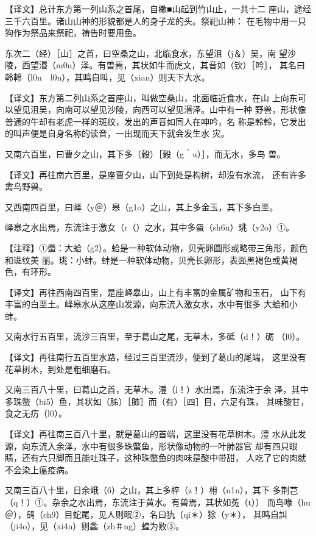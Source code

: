 \documentclass[a4paper,12pt,UTF8,twoside]{ctexbook}
\begin{document}
【译文】总计东方第一列山系之首尾，自樕■山起到竹山止，一共十二 座山，途经三千六百里。诸山山神的形貌都是人的身子龙的头。祭祀山神： 在毛物中用一只狗作为祭品来祭祀，祷告时要用鱼。

东次二（经）［山］之首，曰空桑之山，北临食水，东望沮（j＆）吴，南 望沙陵，西望湣（m0n）泽。有兽焉，其状如牛而虎文，其音如（钦）［吟］， 其名曰軨軨（l0n　l0n），其鸣自叫，见（xian）则天下大水。

【译文】东方第二列山系之首座山，叫做空桑山，北面临近食水，在山 上向东可以望见沮吴，向南可以望见沙陵，向西可以望见湣泽。山中有一种 野兽，形状像普通的牛却有老虎一样的斑纹，发出的声音如同人在呻吟，名 称是軨軨，它发出的叫声便是自身名称的读音，一出现而天下就会发生水 灾。

又南六百里，曰曹夕之山，其下多（穀）［榖（g＾u）］，而无水，多鸟 兽。

【译文】再往南六百里，是座曹夕山，山下到处是构树，却没有水流， 还有许多禽鸟野兽。

又西南四百里，曰峄（y＠）皋（g1o）之山，其上多金玉，其下多白垩。

峄皋之水出焉，东流注于激女（r（）之水，其中多蜃（sh6n）珧（y2o）①。

【注释】①蜃：大蛤（g2）。蛤是一种软体动物，贝壳卵圆形或略带三角形，颜色和斑纹美 丽。珧：小蚌。蚌是一种软体动物，贝壳长卵形，表面黑褐色或黄褐色，有环形。

【译文】再往西南四百里，是座峄皋山，山上有丰富的金属矿物和玉石， 山下有丰富的白垩土。峄皋水从这座山发源，向东流入激女水，水中有很多 大蛤和小蚌。

又南水行五百里，流沙三百里，至于葛山之尾，无草木，多砥（d！）砺 （l0）。

【译文】再往南行五百里水路，经过三百里流沙，便到了葛山的尾端， 这里没有花草树木，到处是粗细磨石。

又南三百八十里，曰葛山之首，无草木。澧（l！）水出焉，东流注于余 泽，其中多珠蟞（bi5）鱼，其状如（胏）［肺］而（有）［四］目，六足有珠， 其味酸甘，食之无疠（l0）。

【译文】再往南三百八十里，就是葛山的首端，这里没有花草树木。澧 水从此发源，向东流入余泽，水中有很多珠蟞鱼，形状像动物的一叶肺器官 却有四只眼睛，还有六只脚而且能吐珠子，这种珠蟞鱼的肉味是酸中带甜， 人吃了它的肉就不会染上瘟疫病。

又南三百八十里，日余峨（6）之山，其上多梓（z！）枏（n1n），其下 多荆芑（q！）①。杂余之水出焉，东流注于黄水。有兽焉，其状如菟（t）） 而鸟喙（hu＠），鸱（ch9）目蛇尾，见人则眠②，名曰犰（qi＊）狳（y＊）， 其鸣自訆（ji4o），见（xi4n）则螽（zh＃ng）蝗为败③。
\end{document}
